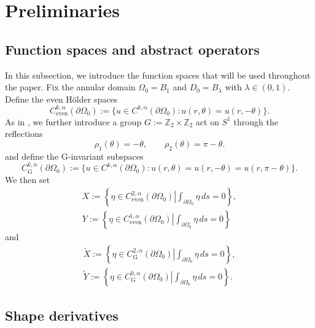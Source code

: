 \documentclass[reqno]{amsart}
\numberwithin{equation}{section}
\numberwithin{equation}{section}
\numberwithin{equation}{section}
\begin{document}
\medskip
\section{Preliminaries}

\subsection{Function spaces and abstract operators}
In this subsection, we introduce the function spaces that will be used throughout the paper. Fix the annular domain \(\Omega_0 = B_1\) and \(D_0 = B_\lambda\) with \(\lambda \in (0,1)\). Define the even H\"older spaces
\[
C_{\mathrm{even}}^{k,\alpha}(\partial \Omega_0) := \bigl\{ u \in C^{k,\alpha}(\partial \Omega_0) : u(r,\theta) = u(r,-\theta) \bigr\}.
\]
As in \cite[Lemma 2.2]{KamburovS}, we further introduce a group $G:=\mathbb Z_2\times \mathbb Z_2$ act on $S^1$ through the reflections
\[
\rho_1(\theta)= -\theta,
\qquad
\rho_2(\theta)= \pi-\theta .
\]
and define the G-invariant subspaces
\[
C_{\mathrm{G}}^{k,\alpha}(\partial \Omega_0) := \bigl\{ u \in C^{k,\alpha}(\partial \Omega_0) : u(r,\theta)=u(r,-\theta)=u(r,\pi-\theta)\}.
\]
We then set
\begin{equation}
\label{e2.1}
\begin{aligned}
X := \left\{\left. \eta \in C_{\mathrm{even}}^{2,\alpha}(\partial \Omega_0) \right|\int_{\partial \Omega_0} \eta \, ds = 0 \right\}, \\
Y :=\left\{\left.  \eta \in C_{\mathrm{even}}^{1,\alpha}(\partial \Omega_0)\right| \int_{\partial \Omega_0} \eta \, ds = 0 \right\}
\end{aligned}
\end{equation}
and
\begin{equation}
\label{e2.2}
\begin{aligned}
\widetilde{X} := \left\{\left. \eta \in C_{\mathrm{G}}^{2,\alpha}(\partial \Omega_0) \right|\int_{\partial \Omega_0} \eta \, ds = 0 \right\}, \\
\widetilde{Y} :=\left\{\left.  \eta \in C_{\mathrm{G}}^{0,\alpha}(\partial \Omega_0)\right| \int_{\partial \Omega_0} \eta \, ds = 0 \right\}.
\end{aligned}
\end{equation}



\subsection{Shape derivatives}
\end{document}
